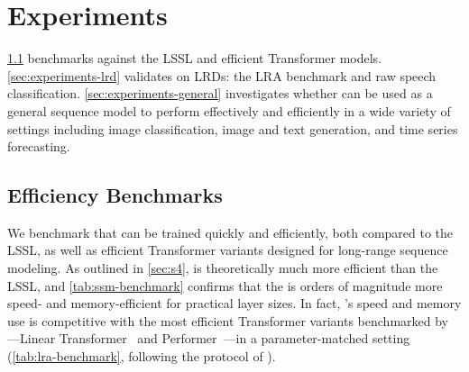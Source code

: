 \section{Experiments}
\label{sec:experiments}

\cref{sec:experiments-benchmark} benchmarks \methodabbrv{} against the LSSL and efficient Transformer models.
\cref{sec:experiments-lrd} validates \methodabbrv{} on LRDs: the LRA benchmark and raw speech classification.
\cref{sec:experiments-general} investigates whether \methodabbrv{} can be used as a general sequence model to perform effectively and efficiently in a wide variety of settings including image classification, image and text generation, and time series forecasting.

\subsection{\methodabbrv{} Efficiency Benchmarks}
\label{sec:experiments-benchmark}
We benchmark that \methodabbrv{} can be trained quickly and efficiently, both compared to the LSSL, as well as efficient Transformer variants designed for long-range sequence modeling.
As outlined in \cref{sec:s4}, \methodabbrv{} is theoretically much more efficient than the LSSL, and \cref{tab:ssm-benchmark} confirms that the \methodabbrv{} is orders of magnitude more speed- and memory-efficient for practical layer sizes.
In fact, \methodabbrv's speed and memory use is competitive with the most efficient Transformer variants benchmarked by \citet{tay2021long}---Linear Transformer~\citep{katharopoulos2020transformers} and Performer~\citep{choromanski2020rethinking}---in a parameter-matched setting (\cref{tab:lra-benchmark}, following the protocol of \citet{tay2021long}).


